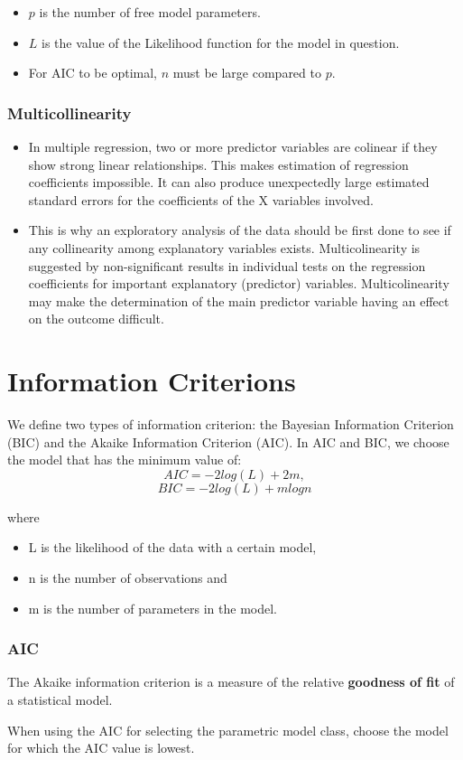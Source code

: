 \begin{frame}
\begin{itemize}
\item $p$ is the number of free model parameters.
\item $L$ is the value of the Likelihood function for the model in question.
\item For AIC to be optimal, $n$ must be large compared to $p$.\\
\end{itemize}
\begin{frame}
\frametitle{Multicollinearity}
\begin{itemize}
\item In multiple regression, two or more predictor variables are colinear if they show strong linear relationships. This makes estimation of regression coefficients impossible. It can also produce unexpectedly large estimated standard errors for the coefficients of the X variables involved.
\item This is why an exploratory analysis of the data should be first done to see if any collinearity among explanatory variables exists. Multicolinearity is suggested by non-significant results in individual tests on the regression coefficients for important explanatory (predictor) variables. Multicolinearity may make the determination of the main predictor variable having an effect on the outcome difficult.
\end{itemize}
\end{frame}



\section{Information Criterions}


We define two types of information criterion: the Bayesian Information
Criterion (BIC) and the Akaike Information Criterion (AIC). In AIC and BIC, we choose the model that
has the minimum value of:
\[AIC = −2log(L)+2m,\]
\[BIC = −2log(L)+mlogn\]

where
\begin{itemize}
\item L is the likelihood of the data with a certain model,
\item n is the number of observations and
\item m is the number of parameters in the model.
\end{itemize}
\frametitle{AIC}
The Akaike information criterion is a measure of the relative \textbf{goodness of fit} of a statistical model.

When using the AIC for selecting the parametric model class, choose
the model for which the AIC value is lowest.
\end{frame}

